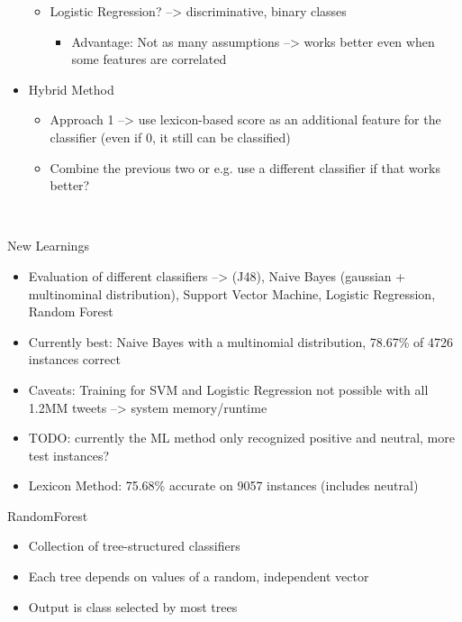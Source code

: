 \begin{itemize}
\begin{itemize}
\begin{itemize}
           
        \end{itemize}
        \item Logistic Regression? --> discriminative, binary classes
        \begin{itemize}
        \item Advantage: Not as many assumptions --> works better even when some features are correlated
        \end{itemize} 
        
    \end{itemize}
    \item Hybrid Method
    \begin{itemize}
        \item Approach 1 --> use lexicon-based score as an additional feature for the classifier (even if 0, it still can be classified)
        \item Combine the previous two or e.g. use a different classifier if that works better?
    \end{itemize}
\end{itemize}
\

New Learnings
\begin{itemize}
    \item Evaluation of different classifiers --> (J48), Naive Bayes (gaussian + multinominal distribution), Support Vector Machine, Logistic Regression, Random Forest
    \item Currently best: Naive Bayes with a multinomial distribution, 78.67\% of 4726 instances correct
    \item Caveats: Training for SVM and Logistic Regression not possible with all 1.2MM tweets --> system memory/runtime
    \item TODO: currently the ML method only recognized positive and neutral, more test instances?
    \item Lexicon Method: 75.68\% accurate on 9057 instances (includes neutral)
\end{itemize}

RandomForest
\begin{itemize}
    \item Collection of tree-structured classifiers
    \item Each tree depends on values of a random, independent vector
    \item Output is class selected by most trees
\end{itemize}

